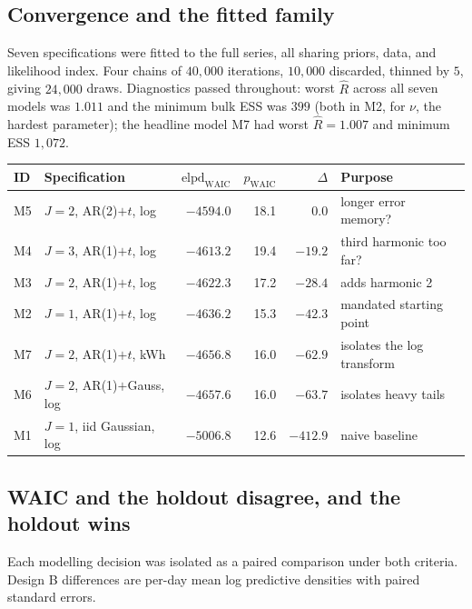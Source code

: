 \documentclass[11pt]{article}
\begin{document}
\subsection{Convergence and the fitted family}

Seven specifications were fitted to the full series, all sharing priors, data,
and likelihood index. Four chains of $40{,}000$ iterations, $10{,}000$
discarded, thinned by $5$, giving $24{,}000$ draws. Diagnostics passed
throughout: worst $\hat R$ across all seven models was $1.011$ and the minimum
bulk ESS was $399$ (both in M2, for $\nu$, the hardest parameter); the
headline model M7 had worst $\hat R = 1.007$ and minimum ESS $1{,}072$.

\begin{center}
\small
\begin{tabular}{@{}llrrrl@{}}
\toprule
ID & Specification & $\mathrm{elpd}_{\mathrm{WAIC}}$ & $p_{\mathrm{WAIC}}$ & $\Delta$ & Purpose \\
\midrule
M5 & $J{=}2$, AR(2)$+t$, log & $-4594.0$ & 18.1 & $0.0$ & longer error memory? \\
M4 & $J{=}3$, AR(1)$+t$, log & $-4613.2$ & 19.4 & $-19.2$ & third harmonic too far? \\
M3 & $J{=}2$, AR(1)$+t$, log & $-4622.3$ & 17.2 & $-28.4$ & adds harmonic 2 \\
M2 & $J{=}1$, AR(1)$+t$, log & $-4636.2$ & 15.3 & $-42.3$ & mandated starting point \\
M7 & $J{=}2$, AR(1)$+t$, kWh & $-4656.8$ & 16.0 & $-62.9$ & isolates the log transform \\
M6 & $J{=}2$, AR(1)$+$Gauss, log & $-4657.6$ & 16.0 & $-63.7$ & isolates heavy tails \\
M1 & $J{=}1$, iid Gaussian, log & $-5006.8$ & 12.6 & $-412.9$ & naive baseline \\
\bottomrule
\end{tabular}
\end{center}

\subsection{WAIC and the holdout disagree, and the holdout wins}

Each modelling decision was isolated as a paired comparison under both
criteria. Design B differences are per-day mean log predictive densities with
paired standard errors.
\end{document}
